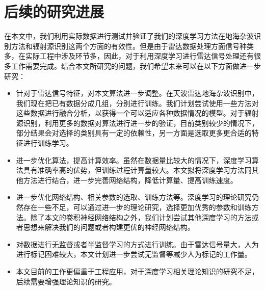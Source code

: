 \section{后续的研究进展}
在本文中，我们利用实际数据进行测试并验证了我们的深度学习方法在地海杂波识别方法和辐射源识别这两个方面的有效性。但是由于雷达数据处理方面信号种类多，在实际工程中涉及环节多，因此，对于利用深度学习进行雷达信号处理还有很多工作需要完成。结合本文所研究的问题，我们希望未来可以在以下方面做进一步研究：
\begin{itemize}
	\item 针对于雷达信号特征，对本文算法进一步调整。在天波雷达地海杂波识别中，我们现在把已有数据分成几组，分别进行训练。我们计划尝试使用一些方法对这些数据进行融合分析，以获得一个可以适应各种数据情况的模型。对于辐射源识别，利用更多的数据对算法进行进一步的验证，目前类别较少的情况下，部分结果会对选择的类别具有一定的依赖性，另一方面是选取更多更合适的特征进行训练学习。
	\item 进一步优化算法，提高计算效率。虽然在数据量比较大的情况下，深度学习算法具有准确率高的优势，但训练过程计算量较大。本文拟将深度学习方法同其他方法进行结合，进一步完善网络结构，降低计算量、提高训练速度。
	\item 进一步优化网络结构、相关参数的选取、训练方法等。深度学习的理论研究仍然存在一些不足，可以通过进一步的理论研究，选择更加优秀的参数和训练方法。除了本文的卷积神经网络结构之外，我们计划尝试其他深度学习的方法或者思想来解决我们的问题或者构建更优的神经网络结构。
	\item 对数据进行无监督或者半监督学习的方式进行训练。由于雷达信号量大，人为进行标记困难较大，本文计划进一步尝试无监督等减少人为标记的工作量。
	\item 本文目前的工作更偏重于工程应用，对于深度学习相关理论知识的研究不足，后续需要增强理论知识的研究。
\end{itemize}
